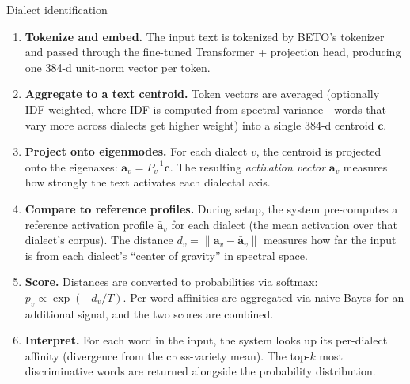\documentclass[11pt,a4paper]{article}
\begin{document}
\begin{howbox}{Dialect identification}
\begin{enumerate}[nosep]
  \item \textbf{Tokenize and embed.} The input text is tokenized by
    BETO's tokenizer and passed through the fine-tuned Transformer +
    projection head, producing one 384-d unit-norm vector per token.

  \item \textbf{Aggregate to a text centroid.} Token vectors are
    averaged (optionally IDF-weighted, where IDF is computed from
    spectral variance---words that vary more across dialects get
    higher weight) into a single 384-d centroid $\mathbf{c}$.

  \item \textbf{Project onto eigenmodes.} For each dialect $v$, the
    centroid is projected onto the eigenaxes:
    $\mathbf{a}_v = P_v^{-1} \mathbf{c}$. The resulting
    \emph{activation vector} $\mathbf{a}_v$ measures how strongly
    the text activates each dialectal axis.

  \item \textbf{Compare to reference profiles.} During setup, the
    system pre-computes a reference activation profile
    $\bar{\mathbf{a}}_v$ for each dialect (the mean activation
    over that dialect's corpus). The distance
    $d_v = \|\mathbf{a}_v - \bar{\mathbf{a}}_v\|$ measures how
    far the input is from each dialect's ``center of gravity'' in
    spectral space.

  \item \textbf{Score.} Distances are converted to probabilities
    via softmax: $p_v \propto \exp(-d_v / T)$. Per-word affinities
    are aggregated via naive Bayes for an additional signal, and the
    two scores are combined.

  \item \textbf{Interpret.} For each word in the input, the system
    looks up its per-dialect affinity (divergence from the
    cross-variety mean). The top-$k$ most discriminative words are
    returned alongside the probability distribution.
\end{enumerate}
\end{howbox}
\end{document}
